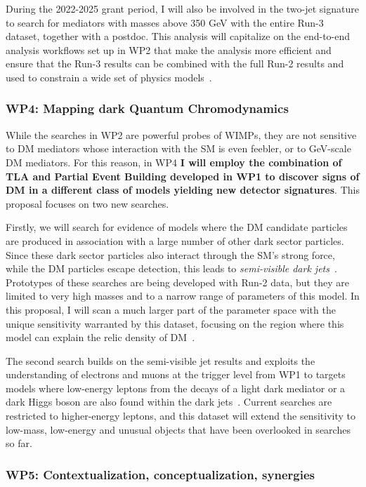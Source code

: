 \documentclass[11pt,a4paper]{article}
\begin{document}
During the 2022-2025 grant period, I will also be involved in the two-jet signature to search for mediators with masses above 350 GeV with the entire Run-3 dataset, together with a postdoc. 
This analysis will capitalize on the end-to-end analysis workflows set up in WP2 that make the analysis more efficient and ensure that the Run-3 results can be combined with the full Run-2 results and used to constrain a wide set of physics models~\cite{Resonances}.   

\subsubsection*{WP4: Mapping dark Quantum Chromodynamics}

While the searches in WP2 are powerful probes of WIMPs, they are not sensitive to DM mediators whose interaction with the SM is even feebler, or to GeV-scale DM mediators. 
For this reason, in WP4 \textbf
{I will employ the combination of TLA and Partial Event Building developed in WP1 to discover signs of DM in a different class of models yielding new detector signatures}. 
This proposal focuses on two new searches.  

Firstly, we will search for evidence of models where the DM candidate particles are produced in association with a large number of other dark sector particles. 
Since these dark sector particles also interact through the SM's strong force, while the DM particles escape detection, this leads to \textit{semi-visible dark jets}~\cite{NewScenario}.
Prototypes of these searches are being developed with Run-2 data, but they are limited to very high masses and to a narrow range of parameters of this model. 
In this proposal, I will scan a much larger part of the parameter space with the unique sensitivity warranted by this dataset, focusing on the region where this model can explain the relic density of DM~\cite{Felix}. 

The second search builds on the semi-visible jet results and exploits the understanding of electrons and muons at the trigger level from WP1 to targets models where low-energy leptons from the decays of a light dark mediator or a dark Higgs boson are also found within the dark jets~\cite{HAHM,FWRZ,Prestel?}. 
Current searches are restricted to higher-energy leptons, and this dataset will extend the sensitivity to low-mass, low-energy and unusual objects that have been overlooked in searches so far. 

\subsubsection*{WP5: Contextualization, conceptualization, synergies}
\end{document}
